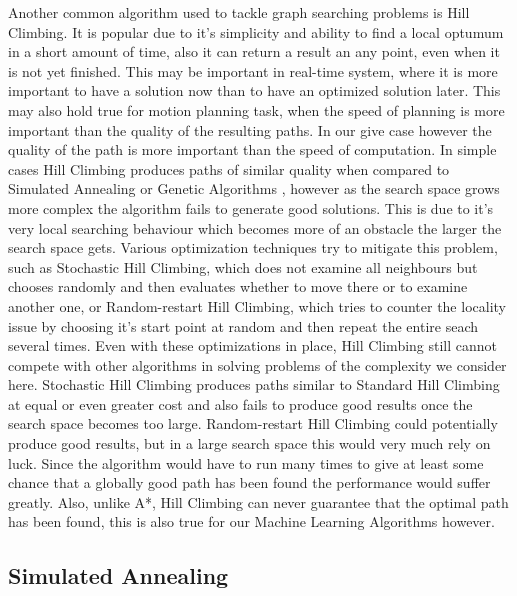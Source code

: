 Another common algorithm used to tackle graph searching problems is Hill Climbing. It is popular due to it's simplicity and ability to find a local optumum in a short amount of time, also it can return a result an any point, even when it is not yet finished. This may be important in real-time system, where it is more important to have a solution now than to have an optimized solution later. This may also hold true for motion planning task, when the speed of planning is more important than the quality of the resulting paths. In our give case however the quality of the path is more important than the speed of computation. In simple cases Hill Climbing produces paths of similar quality when compared to Simulated Annealing or Genetic Algorithms \cite{8}, however as the search space grows more complex the algorithm fails to generate good solutions. This is due to it's very local searching behaviour which becomes more of an obstacle the larger the search space gets. Various optimization techniques try to mitigate this problem, such as Stochastic Hill Climbing, which does not examine all neighbours but chooses randomly and then evaluates whether to move there or to examine another one, or Random-restart Hill Climbing, which tries to counter the locality issue by choosing it's start point at random and then repeat the entire seach several times. Even with these optimizations in place, Hill Climbing still cannot compete with other algorithms in solving problems of the complexity we consider here. Stochastic Hill Climbing produces paths similar to Standard Hill Climbing at equal or even greater cost \cite{8} and also fails to produce good results once the search space becomes too large. Random-restart Hill Climbing could potentially produce good results, but in a large search space this would very much rely on luck. Since the algorithm would have to run many times to give at least some chance that a globally good path has been found the performance would suffer greatly. Also, unlike A*, Hill Climbing can never guarantee that the optimal path has been found, this is also true for our Machine Learning Algorithms however.

\subsection{Simulated Annealing}
\label{sec:simulated_annealing}

